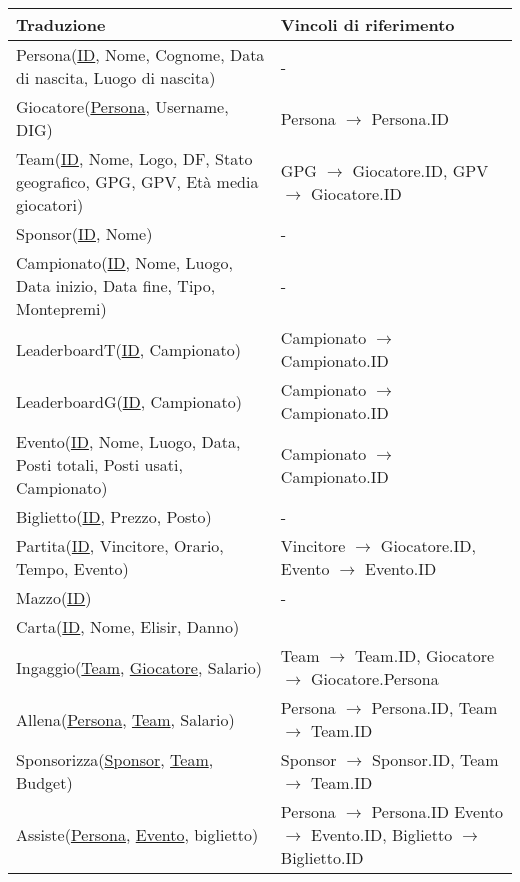 \documentclass{article}
\begin{document}
\begin{table}
    \centering
    \begin{tabularx}{\textwidth}{|X|X|}
        \hline
        \textbf{Traduzione} & \textbf{Vincoli di riferimento} \\ \hline
        Persona(\underline{ID}, Nome, Cognome, Data di nascita, Luogo di nascita) & - \\ \hline
        Giocatore(\underline{Persona}, Username, DIG) & Persona $\xrightarrow{}$ Persona.ID \\ \hline
        Team(\underline{ID}, Nome, Logo, DF, Stato geografico, GPG, GPV, Età media giocatori) & GPG $\xrightarrow{}$ Giocatore.ID, GPV $\xrightarrow{}$ Giocatore.ID \\ \hline
        Sponsor(\underline{ID}, Nome) & - \\ \hline
        Campionato(\underline{ID}, Nome, Luogo, Data inizio, Data fine, Tipo, Montepremi) & - \\ \hline
        LeaderboardT(\underline{ID}, Campionato) & Campionato $\xrightarrow{}$ Campionato.ID \\ \hline
        LeaderboardG(\underline{ID}, Campionato) & Campionato $\xrightarrow{}$ Campionato.ID \\ \hline
        Evento(\underline{ID}, Nome, Luogo, Data, Posti totali, Posti usati, Campionato) & Campionato $\xrightarrow{}$ Campionato.ID \\ \hline
        Biglietto(\underline{ID}, Prezzo, Posto) & - \\ \hline
        Partita(\underline{ID}, Vincitore, Orario, Tempo, Evento) & Vincitore $\xrightarrow{}$ Giocatore.ID, Evento $\xrightarrow{}$ Evento.ID \\ \hline
        Mazzo(\underline{ID}) & - \\ \hline %
        Carta(\underline{ID}, Nome, Elisir, Danno) & \\ \hline
        Ingaggio(\underline{Team}, \underline{Giocatore}, Salario) & Team $\xrightarrow{}$ Team.ID, Giocatore $\xrightarrow{}$ Giocatore.Persona \\ \hline %
        Allena(\underline{Persona}, \underline{Team}, Salario) & Persona $\xrightarrow{}$ Persona.ID, Team $\xrightarrow{}$ Team.ID \\ \hline
        Sponsorizza(\underline{Sponsor}, \underline{Team}, Budget) & Sponsor $\xrightarrow{}$ Sponsor.ID, Team $\xrightarrow{}$ Team.ID \\ \hline
        Assiste(\underline{Persona}, \underline{Evento}, biglietto) & Persona $\xrightarrow{}$ Persona.ID Evento $\xrightarrow{}$ Evento.ID, Biglietto $\xrightarrow{}$ Biglietto.ID \\ \hline

\end{tabularx}
\end{table}
\end{document}
